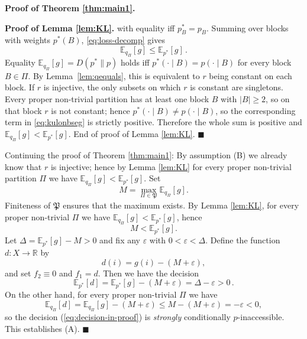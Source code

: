 \documentclass[10pt, letterpaper]{article}%
\theoremstyle{definition}
\renewenvironment{proof}[1][\unskip]{%
\par
\noindent
\textbf{Proof #1.}
\noindent}
{\hfill$\blacksquare$

\bigskip}
\newcommand{\E}{\mathbb E}
\newcommand{\1}{\mathbf 1}
\begin{document}
\begin{proof}[of Theorem \ref{thm:main1}]
\begin{proof}[of Lemma \ref{lem:KL}]
		with equality iff $p^*_B=p_B$. Summing over blocks with weights $p^*(B)$, \eqref{eq:loss-decomp} gives
		\[
			\E_{q_{\Pi}}[g] \leq \E_{p^*}[g]\,.
		\]
		Equality $\E_{q_\Pi}[g]=D(p^*\|p)$ holds iff $p^*(\cdot\mid B)=p(\cdot\mid B)$ for every
		block $B\in\Pi$. By Lemma~\ref{lem:qequals}, this is equivalent to $r$ being constant on each block.
		If $r$ is injective, the only subsets on which $r$ is constant are singletons. Every proper non-trivial partition has at least
		one block $B$ with $|B|\ge 2$, so on that block $r$ is not constant; hence $p^*(\cdot\mid B)\neq p(\cdot\mid B)$, so the
		corresponding term in \eqref{eq:kulonbseg} is strictly positive. Therefore the whole sum is
		positive and $\E_{q_\Pi}[g] < \E_{p^*}[g]$. End of proof of Lemma \ref{lem:KL}.
	\end{proof}
	
	Continuing the proof of Theorem \ref{thm:main1}: By assumption (B) we already know that $r$ is injective; hence by Lemma \ref{lem:KL} for every proper non-trivial partition
	$\Pi$ we have $\E_{q_{\Pi}}[g] < \E_{p^*}[g]$.
	Set
	\[
		M=\max_{\Pi\in\mathfrak P} \E_{q_\Pi}[g].
	\]
	Finiteness of $\mathfrak P$ ensures that the maximum exists.
	By Lemma \ref{lem:KL}, for every proper non-trivial $\Pi$ we have $\E_{q_\Pi}[g]<\E_{p^*}[g]$, hence
	\[
		M < \E_{p^*}[g].
	\]
	Let $\Delta =\E_{p^*}[g]-M>0$ and fix any $\varepsilon$ with $0<\varepsilon<\Delta$. Define the function $d\colon X\to \mathbb{R}$ by
	\[
		d(i) = g(i)-(M+\varepsilon),
	\]
	and set $f_2\equiv 0$ and $f_1=d$. Then we have the decision
    \begin{equation}\label{eq:decision-in-proof}
     \E_{p^*}[d]=\E_{p^*}[g]-(M+\varepsilon)=\Delta-\varepsilon>0\,.  
     \end{equation}
	On the other hand, for every proper non-trivial $\Pi$ we have
	\[
		\E_{q_\Pi}[d]=\E_{q_\Pi}[g]-(M+\varepsilon)\le M-(M+\varepsilon)=-\varepsilon<0,
	\]
	so the decision (\ref{eq:decision-in-proof}) is \emph{strongly} conditionally $p$-inaccessible. 
	This establishes (A).
\end{proof}
\end{document}
